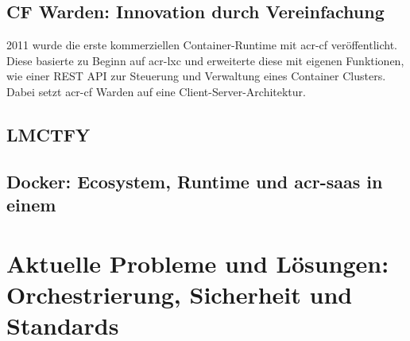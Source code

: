 \subsection{CF Warden: Innovation durch Vereinfachung}
\label{sec:geschichteCFWarden}
2011 wurde die erste kommerziellen Container-Runtime mit \gls{acr-cf} veröffentlicht. Diese basierte zu Beginn auf \gls{acr-lxc} und erweiterte diese mit eigenen Funktionen, wie einer REST API zur Steuerung und Verwaltung eines Container Clusters. Dabei setzt \gls{acr-cf} Warden auf eine Client-Server-Architektur.

\subsection{LMCTFY}
\label{sec:geschichteLMCTFY}

\subsection{Docker: Ecosystem, Runtime und \gls{acr-saas} in einem}
\label{sec:geschichteDocker}

\section{Aktuelle Probleme und Lösungen: Orchestrierung, Sicherheit und Standards}
\label{sec:geschichte}


